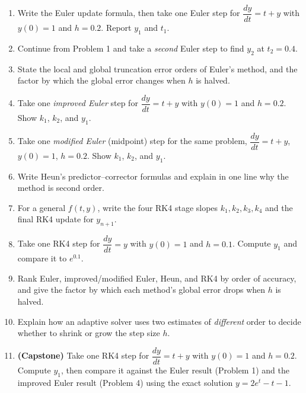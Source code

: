 \begin{enumerate}[leftmargin=2em]
    \item Write the Euler update formula, then take one Euler step for
          $\dfrac{dy}{dt} = t + y$ with $y(0) = 1$ and $h = 0.2$. Report $y_1$
          and $t_1$.

    \item Continue from Problem 1 and take a \emph{second} Euler step to find
          $y_2$ at $t_2 = 0.4$.

    \item State the local and global truncation error orders of Euler's method,
          and the factor by which the global error changes when $h$ is halved.

    \item Take one \emph{improved Euler} step for $\dfrac{dy}{dt} = t + y$ with
          $y(0) = 1$ and $h = 0.2$. Show $k_1$, $k_2$, and $y_1$.

    \item Take one \emph{modified Euler} (midpoint) step for the same problem,
          $\dfrac{dy}{dt} = t + y$, $y(0)=1$, $h = 0.2$. Show $k_1$, $k_2$, and
          $y_1$.

    \item Write Heun's predictor--corrector formulas and explain in one line why
          the method is second order.

    \item For a general $f(t,y)$, write the four RK4 stage slopes
          $k_1,k_2,k_3,k_4$ and the final RK4 update for $y_{n+1}$.

    \item Take one RK4 step for $\dfrac{dy}{dt} = y$ with $y(0) = 1$ and
          $h = 0.1$. Compute $y_1$ and compare it to $e^{0.1}$.

    \item Rank Euler, improved/modified Euler, Heun, and RK4 by order of
          accuracy, and give the factor by which each method's global error
          drops when $h$ is halved.

    \item Explain how an adaptive solver uses two estimates of \emph{different}
          order to decide whether to shrink or grow the step size $h$.

    \item \textbf{(Capstone)} Take one RK4 step for $\dfrac{dy}{dt} = t + y$ with
          $y(0) = 1$ and $h = 0.2$. Compute $y_1$, then compare it against the
          Euler result (Problem 1) and the improved Euler result (Problem 4)
          using the exact solution $y = 2e^{t} - t - 1$.
\end{enumerate}

